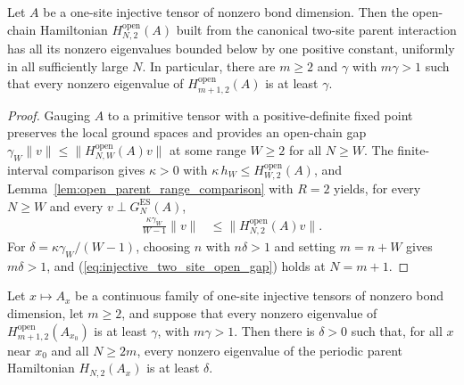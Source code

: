 \begin{lemma}
    \label{thm:injective_strict_knabe_window}
    \leanok
    Let $A$ be a one-site injective tensor of nonzero bond dimension. Then the
    open-chain Hamiltonian $H^{\mathrm{open}}_{N,2}(A)$ built from the
    canonical two-site parent interaction has all its nonzero eigenvalues
    bounded below by one positive constant, uniformly in all sufficiently
    large $N$. In particular, there are $m\geq2$ and $\gamma$ with
    $m\gamma>1$ such that every nonzero eigenvalue of
    $H^{\mathrm{open}}_{m+1,2}(A)$ is at least $\gamma$.
\end{lemma}

\begin{proof}
    \leanok
    Gauging $A$ to a primitive tensor with a positive-definite fixed point
    preserves the local ground spaces and provides an open-chain gap
    $\gamma_W\lVert v\rVert\leq\lVert H^{\mathrm{open}}_{N,W}(A)v\rVert$ at some
    range $W\geq2$ for all $N\geq W$. The finite-interval comparison gives
    $\kappa>0$ with $\kappa\,h_W\leq H^{\mathrm{open}}_{W,2}(A)$, and
    Lemma~\ref{lem:open_parent_range_comparison} with $R=2$ yields, for every
    $N\geq W$ and every $v\perp G_N^{\mathrm{ES}}(A)$,
    \begin{align}
        \frac{\kappa\gamma_W}{W-1}\lVert v\rVert
         & \leq\lVert H^{\mathrm{open}}_{N,2}(A)v\rVert.
        \label{eq:injective_two_site_open_gap}
    \end{align}
    For $\delta=\kappa\gamma_W/(W-1)$, choosing $n$ with $n\delta>1$ and
    setting $m=n+W$ gives $m\delta>1$, and
    (\ref{eq:injective_two_site_open_gap}) holds at $N=m+1$.
\end{proof}

\begin{lemma}
    \label{thm:knabe_gap_neighborhood}
    \leanok
    Let $x\mapsto A_x$ be a continuous family of one-site injective tensors of
    nonzero bond dimension, let $m\geq2$, and suppose that every nonzero
    eigenvalue of $H^{\mathrm{open}}_{m+1,2}(A_{x_0})$ is at least $\gamma$,
    with $m\gamma>1$. Then there is
    $\delta>0$ such that, for all $x$ near $x_0$ and all $N\geq2m$, every
    nonzero eigenvalue of the periodic parent Hamiltonian $H_{N,2}(A_x)$ is
    at least $\delta$.
\end{lemma}

